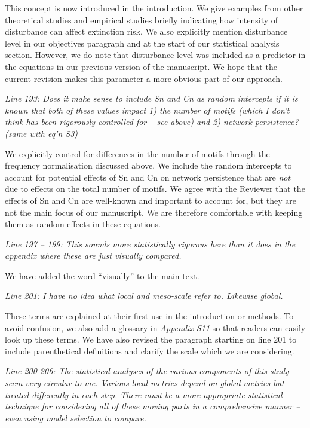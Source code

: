 \documentclass[12pt]{article}
\newcommand{\us}{\rm \setlength{\leftskip}{0.3cm} \setlength{\rightskip}{0.3cm}}
\newcommand{\them}{\it \setlength{\leftskip}{0cm} \setlength{\rightskip}{0cm}}
\begin{document}
        \us This concept is now introduced in the introduction. We give examples from other theoretical studies and empirical studies briefly indicating how intensity of disturbance can affect extinction risk. We also explicitly mention disturbance level in our objectives paragraph and at the start of our statistical analysis section. However, we do note that disturbance level was included as a predictor in the equations in our previous version of the manuscript. We hope that the current revision makes this parameter a more obvious part of our approach.
        
        \them
        Line 193: Does it make sense to include Sn and Cn as random intercepts if it is known that both of these values impact 1) the number of motifs (which I don’t think has been rigorously controlled for – see above) and 2) network persistence? (same with eq’n S3)
        
        \us
        We explicitly control for differences in the number of motifs through the frequency normalisation discussed above. We include the random intercepts to account for potential effects of Sn and Cn on network persistence that are \emph{not} due to effects on the total number of motifs. We agree with the Reviewer that the effects of Sn and Cn are well-known and important to account for, but they are not the main focus of our manuscript. We are therefore comfortable with keeping them as random effects in these equations.
        
        
        \them
        Line 197 – 199: This sounds more statistically rigorous here than it does in the appendix where these are just visually compared.
        
        \us We have added the word ``visually'' to the main text.
        
        \them
        Line 201: I have no idea what local and meso-scale refer to. Likewise global.
        
        \us These terms are explained at their first use in the introduction or methods. To avoid confusion, we also add a glossary in \emph{Appendix S11} so that readers can easily look up these terms. We have also revised the paragraph starting on line 201 to include parenthetical definitions and clarify the scale which we are considering.
        
        \them
        Line 200-206: The statistical analyses of the various components of this study seem very circular to me. Various local metrics depend on global metrics but treated differently in each step. There must be a more appropriate statistical technique for considering all of these moving parts in a comprehensive manner – even using model selection to compare.
        
\end{document}
